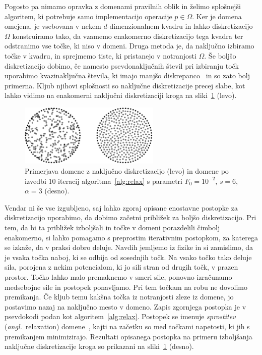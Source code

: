 \documentclass[12pt,a4paper,twoside]{article}
\theoremstyle{definition} %
\theoremstyle{plain} %
\numberwithin{equation}{section}
\newcommand{\ang}[1]{(\hspace{-1.5px}\textit{angl.}\ #1)}
\begin{document}
Pogosto pa nimamo opravka z domenami pravilnih oblik in želimo splošnejši algoritem, ki potrebuje
samo implementacijo operacije $p \in \Omega$. Ker je domena omejena, je vsebovana v nekem
$d$-dimenzionalnem kvadru in lahko diskretizacijo $\Omega$ konstruiramo tako, da vzamemo enakomerno
diskretizacijo tega kvadra ter odstranimo vse točke, ki niso v domeni. Druga metoda je, da
naključno izbiramo točke v kvadru, in sprejmemo tiste, ki pristanejo v notranjosti $\Omega$. Še
boljšo diskretizacijo dobimo, če namesto psevdonaključnih števil pri izbiranju točk
uporabimo kvazinaključna števila, ki imajo manjšo diskrepanco~\cite{morokoff1994quasi} in so zato
bolj primerna. Kljub njihovi splošnosti so naključne diskretizacije precej slabe, kot lahko vidimo
na enakomerni naključni diskretizaciji kroga na sliki~\ref{fig:relax-circle} (levo).

\begin{figure}[!ht]
  \centering
  \includegraphics[width=0.6\textwidth]{images/relax_comparison.pdf}
  \caption[Primerjava naključno diskretizirane in izboljšane domene.]{Primerjava domene z naključno
  diskretizacijo (levo) in domene po izvedbi 10 iteracij algoritma~\ref{alg:relax} s parametri $F_0
  = 10^{-2}$, $s = 6$, $\alpha = 3$ (desno).}
  \label{fig:relax-circle}
\end{figure}

Vendar ni še vse izgubljeno, saj lahko zgoraj opisane enostavne postopke za diskretizacijo
uporabimo, da dobimo začetni približek za boljšo diskretizacijo. Pri tem, da bi ta približek
izboljšali in točke v domeni porazdelili čimbolj enakomerno, si lahko pomagamo s preprostim
iterativnim postopkom, za katerega se izkaže, da v praksi dobro deluje. Navdih jemljemo iz fizike in
si zamislimo, da je vsaka točka naboj, ki se odbija od sosednjih točk. Na vsako točko tako deluje
sila, porojena z nekim potencialom, ki jo sili stran od drugih točk, v prazen prostor. Točko lahko
malo premaknemo v smeri sile, ponovno izračunamo medsebojne sile in postopek ponavljamo. Pri tem
točkam na robu ne dovolimo premikanja. Če kljub temu kakšna točka iz notranjosti zleze iz domene, jo
postavimo nazaj na naključno mesto v domeno. Zapis zgornjega postopka je v psevdokodi podan kot
algoritem~\ref{alg:relax}. Postopek se imenuje \emph{sprostitev} \ang{relaxation}
domene~\cite[razdelek~2.2]{kosec2016local}, kajti na začetku so med točkami napetosti, ki jih s
premikanjem minimizirajo. Rezultati opisanega postopka na primeru izboljšanja naključne
diskretizacije kroga so prikazani na sliki~\ref{fig:relax-circle} (desno).
\end{document}
